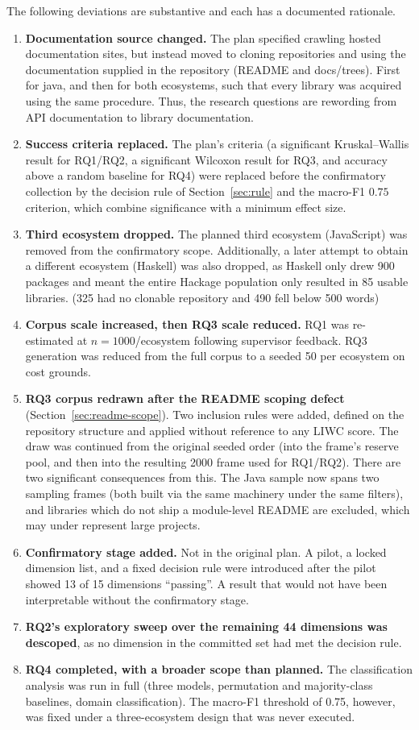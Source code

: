 \documentclass[conference]{IEEEtran}
\begin{document}
The following deviations are substantive and each has a documented rationale.

\begin{enumerate}
\item \textbf{Documentation source changed.} The plan specified crawling hosted documentation sites, but instead moved to cloning repositories and using the documentation supplied in the repository (README and docs/trees). First for java, and then for both ecosystems, such that every library was acquired using the same procedure. Thus, the research questions are rewording from API documentation to library documentation.
\item \textbf{Success criteria replaced.} The plan's criteria (a significant
Kruskal--Wallis result for RQ1/RQ2, a significant Wilcoxon result for RQ3, and
accuracy above a random baseline for RQ4) were replaced before the confirmatory
collection by the decision rule of Section~\ref{sec:rule} and the macro-F1
$0.75$ criterion, which combine significance with a minimum effect size.
\item \textbf{Third ecosystem dropped.} The planned third ecosystem
(JavaScript) was removed from the confirmatory scope. Additionally, a later attempt to obtain a different ecosystem (Haskell) was also dropped, as Haskell only drew 900 packages and meant the entire Hackage population only resulted in 85 usable libraries. (325 had no clonable repository and 490 fell below 500 words)
\item \textbf{Corpus scale increased, then RQ3 scale reduced.} RQ1 was
re-estimated at $n=1000$/ecosystem following supervisor feedback. RQ3 generation
was reduced from the full corpus to a seeded 50 per ecosystem on cost grounds.
\item \textbf{RQ3 corpus redrawn after the README scoping defect}
(Section~\ref{sec:readme-scope}). Two inclusion rules were added, defined on
the repository structure and applied without reference to any LIWC score. The draw was continued from the original seeded order (into the frame's reserve pool, and then into the resulting 2000 frame used for RQ1/RQ2). There are two significant consequences from this. The Java sample now spans two sampling frames (both built via the same machinery under the same filters), and libraries which do not ship a module-level README are excluded, which may under represent large projects.
\item \textbf{Confirmatory stage added.} Not in the original plan. A pilot,
a locked dimension list, and a fixed decision rule were introduced after the
pilot showed 13 of 15 dimensions ``passing''. A result that would not have been
interpretable without the confirmatory stage.
\item \textbf{RQ2's exploratory sweep over the remaining 44 dimensions was
descoped}, as no dimension in the committed set had met the decision rule.
\item \textbf{RQ4 completed, with a broader scope than planned.} The
classification analysis was run in full (three models, permutation and
majority-class baselines, domain classification). The macro-F1
threshold of 0.75, however, was fixed under a three-ecosystem design that was
never executed.
\end{enumerate}
\end{document}
